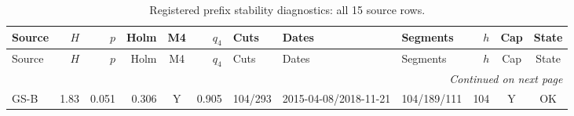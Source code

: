 \begingroup
\fontsize{9}{10.2}\selectfont
\setlength{\tabcolsep}{2.2pt}
\renewcommand{\arraystretch}{1.05}
\setlength{\LTpre}{2pt}
\setlength{\LTpost}{3pt}
\begin{longtable}{lrrrcrlllrcc}
\caption{Registered prefix stability diagnostics: all 15 source rows.}\label{tab:v9-stability-diagnostics}\\
\toprule
Source & $H$ & $p$ & Holm & M4 & $q_4$ & Cuts & Dates & Segments & $h$ & Cap & State\\
\midrule
\endfirsthead
\toprule
Source & $H$ & $p$ & Holm & M4 & $q_4$ & Cuts & Dates & Segments & $h$ & Cap & State\\
\midrule
\endhead
\midrule
\multicolumn{12}{r}{\emph{Continued on next page}}\\
\endfoot
\bottomrule
\endlastfoot
GS-B & 1.83 & 0.051 & 0.306 & Y & 0.905 & 104/293 & 2015-04-08/2018-11-21 & 104/189/111 & 104 & Y & OK\\

\end{longtable}

